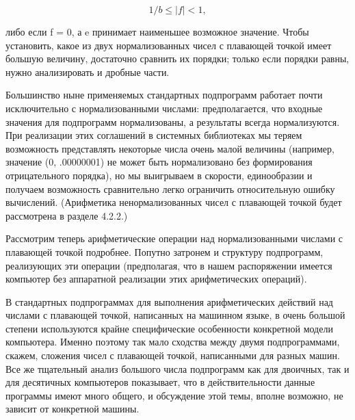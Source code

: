 \begin{enumerate}[label=\Alph*.]
\begin{equation}\label{f5}
1/b \leqslant |f| < 1,
\end{equation}

либо если f = 0, а e принимает наименьшее возможное значение. Чтобы установить, какое из двух нормализованных чисел с плавающей точкой имеет большую величину, достаточно сравнить их порядки; только если порядки равны, нужно анализировать и дробные части.

Большинство ныне применяемых стандартных подпрограмм работает почти исключительно с нормализованными числами: предполагается, что входные значения для подпрограмм нормализованы, а результаты всегда нормализуются. При реализации этих соглашений в системных библиотеках мы теряем возможность представлять некоторые числа очень малой величины (например, значение (0, .00000001) не может быть нормализовано без формирования отрицательного порядка), но мы выигрываем в скорости, единообразии и получаем возможность сравнительно легко ограничить относительную ошибку вычислений. (Арифметика ненормализованных чисел с плавающей точкой будет рассмотрена в разделе 4.2.2.)
\end{enumerate}

Рассмотрим теперь арифметические операции над нормализованными числами с плавающей точкой подробнее. Попутно затронем и структуру подпрограмм, реализующих эти операции (предполагая, что в нашем распоряжении имеется компьютер без аппаратной реализации этих арифметических операций).

В стандартных подпрограммах для выполнения арифметических действий над числами с плавающей точкой, написанных на машинном языке, в очень большой степени используются крайне специфические особенности конкретной модели компьютера. Именно поэтому так мало сходства между двумя подпрограммами, скажем, сложения чисел с плавающей точкой, написанными для разных машин. Все же тщательный анализ большого числа подпрограмм как для двоичных, так и для десятичных компьютеров показывает, что в действительности данные программы имеют много общего, и обсуждение этой темы, вполне возможно, не зависит от конкретной машины. 

